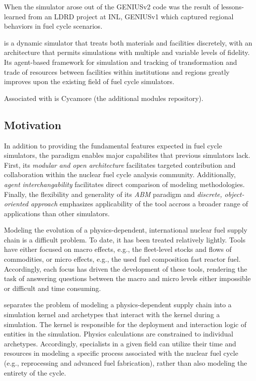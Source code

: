 When the \Cyclus simulator arose out of the 
\gls{GENIUSv2}\cite{oliver_studying_2009,huff_geniusv2_2009} code
was the result of lessons-learned from an \gls{LDRD} project at 
\gls{INL}, 
\gls{GENIUSv1}\cite{dunzik-gougar_global_2007,jain_transitioning_2006} which 
captured regional behaviors in fuel cycle scenarios. 

\Cyclus is a dynamic simulator that treats both materials and facilities discretely, with an 
architecture that permits simulations with multiple and variable levels of 
fidelity. Its agent-based framework for simulation and tracking of 
transformation and trade of resources between facilities within institutions 
and regions greatly improves upon the existing field of fuel cycle simulators.

Associated with \Cyclus is Cycamore (the additional modules repository). 

\subsection{Motivation}

In addition to providing the fundamental features expected in fuel cycle 
simulators, the \Cyclus paradigm enables major capabilites that previous 
simulators lack. First, its \emph{modular and open architecture}  facilitates 
targeted contribution and collaboration within the nuclear fuel cycle analysis 
community.  Additionally, \emph{agent interchangability} facilitates direct 
comparison of modeling methodologies. Finally, the flexibility and generality 
of its \emph{\gls{ABM}} paradigm and \emph{discrete, object-oriented approach} 
emphasizes applicability of the \Cyclus tool accross a broader range of 
applications than other simulators. 

Modeling the evolution of a physics-dependent, international nuclear fuel supply
chain is a difficult problem. To date, it has been treated relatively
lightly. Tools have either focused on macro effects, e.g., the fleet-level
stocks and flows of commodities, or micro effects, e.g., the used fuel
composition fast reactor fuel. Accordingly, each focus has driven the
development of these tools, rendering the task of answering questions between
the macro and micro levels either impossible or difficult and time consuming. 

\Cyclus separates the problem of modeling a
physics-dependent supply chain into a simulation kernel and archetypes that
interact with the kernel during a simulation. The kernel is responsible for the
deployment and interaction logic of entities in the simulation. Physics
calculations are constrained to individual archetypes. Accordingly, specialists
in a given field can utilize their time and resources in modeling a specific
process associated with the nuclear fuel cycle (e.g., reprocessing and advanced
fuel fabrication), rather than also modeling the entirety of the cycle.


